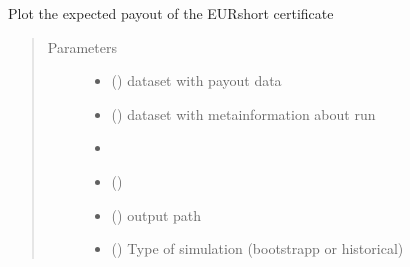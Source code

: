 \documentclass[a4paper,11pt,english]{sphinxmanual}
\begin{document}

\begin{fulllineitems}
\label{\detokenize{simulation_analysis:src.simulation_analysis.task_swap_payout_analysis.plot_eurshort_payout}}
\sphinxAtStartPar
Plot the expected payout of the EURshort certificate
\begin{quote}\begin{description}
\item[{Parameters}] \leavevmode\begin{itemize}
\item {} 
\sphinxAtStartPar
{} () \textendash{} dataset with payout data

\item {} 
\sphinxAtStartPar
{} () \textendash{} dataset with metainformation about run

\item {} 
\sphinxAtStartPar
\sphinxstyleliteralstrong{\sphinxupquote{(}} \textendash{} 

\item {} 
\sphinxAtStartPar
{}\sphinxstyleliteralstrong{\sphinxupquote{)}} () \textendash{} 

\item {} 
\sphinxAtStartPar
{} () \textendash{} output path

\item {} 
\sphinxAtStartPar
{} () \textendash{} Type of simulation (bootstrapp or historical)

\end{itemize}

\end{description}\end{quote}

\end{fulllineitems}
\end{document}
